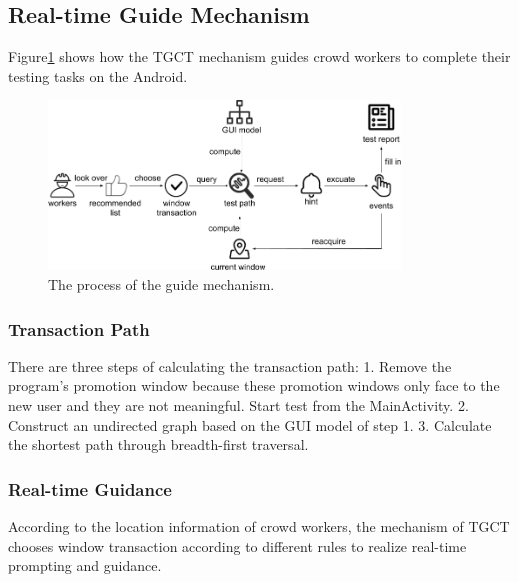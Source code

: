 \subsection{Real-time Guide Mechanism}
Figure\ref{fig:guide} shows how the TGCT mechanism guides crowd workers to complete their testing tasks on the Android.
\begin{figure}[htbp]
\centering
\centerline{\includegraphics[width=\columnwidth,height=4.5cm]{fig/10.png}}
\caption{The process of the guide mechanism.}
\label{fig:guide}
\end{figure}


\subsubsection{Transaction Path}
There are three steps of calculating the transaction path:
1. Remove the program's promotion window because these promotion windows only face to the new user and they are not meaningful. Start test from the MainActivity.
2. Construct an undirected graph based on the GUI model of step 1.
3. Calculate the shortest path through breadth-first traversal.

\subsubsection{Real-time Guidance}
According to the location information of crowd workers, the mechanism of TGCT chooses window transaction according to different rules to realize real-time prompting and guidance. 

